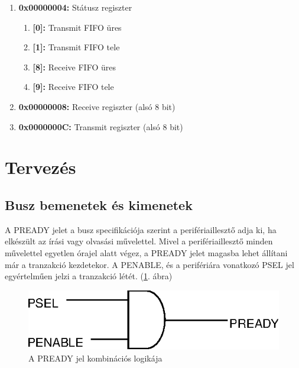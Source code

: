 \begin{enumerate}
\begin{enumerate}
\begin{enumerate}
\end{enumerate}
\item \textbf{0x00000004:} Státusz regiszter
\begin{enumerate}
\item \textbf{[0]:} Transmit FIFO üres
\item \textbf{[1]:} Transmit FIFO tele
\item \textbf{[8]:} Receive FIFO üres
\item \textbf{[9]:} Receive FIFO tele

\end{enumerate}
\item \textbf{0x00000008:} Receive regiszter (alsó 8 bit)
\item \textbf{0x0000000C:} Transmit regiszter (alsó 8 bit)

\end{enumerate}

\end{enumerate}
\newpage
\section{Tervezés}
\subsection{Busz bemenetek és kimenetek}

A PREADY jelet a busz specifikációja szerint a perifériaillesztő adja ki, ha elkészült az írási vagy olvasási művelettel. Mivel a perifériaillesztő minden művelettel egyetlen órajel alatt végez,  a PREADY jelet magasba lehet állítani már a tranzakció kezdetekor. A PENABLE, és a perifériára vonatkozó PSEL jel egyértelműen jelzi a tranzakció létét. (\ref{fig:bloc_pready}. ábra)

\begin{figure}[h]
\vspace{0.5cm}
\begin{center}
\includegraphics{figures/bloc_pready.eps}
\caption{A PREADY jel kombinációs logikája}
\label{fig:bloc_pready}
\end{center}
\vspace{0.5cm}
\end{figure}

